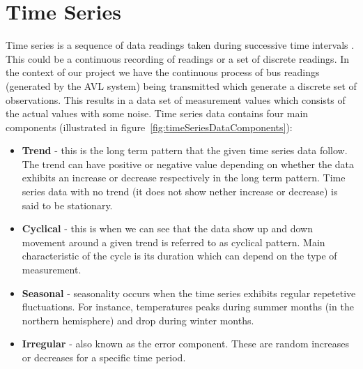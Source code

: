 \section{Time Series}
Time series is a sequence of data readings taken during successive time intervals \cite{shumway2010time}. This could be a continuous recording of readings or a set of discrete readings. In the context of our project we have the continuous process of bus readings (generated by the AVL system) being transmitted which generate a discrete set of observations. This results in a data set of measurement values which consists of the actual values with some noise. Time series data contains four main components (illustrated in figure~\ref{fig:timeSeriesDataComponents})\cite{brockwell2002introduction}:
\begin{itemize}
	\item \textbf{Trend} - this is the long term pattern that the given time series data follow. The trend can have positive or negative value depending on whether the data exhibits an increase or decrease respectively in the long term pattern. Time series data with no trend (it does not show nether increase or decrease) is said to be stationary.
	\item \textbf{Cyclical} - this is when we can see that the data show up and down movement around a given trend is referred to as cyclical pattern. Main characteristic of the cycle is its duration which can depend on the type of measurement.
	\item \textbf{Seasonal} - seasonality occurs when the time series exhibits regular repetetive fluctuations. For instance, temperatures peaks during summer months (in the northern hemisphere) and drop during winter months.
	\item \textbf{Irregular} - also known as the error component. These are random increases or decreases for a specific time period.
\end{itemize}

